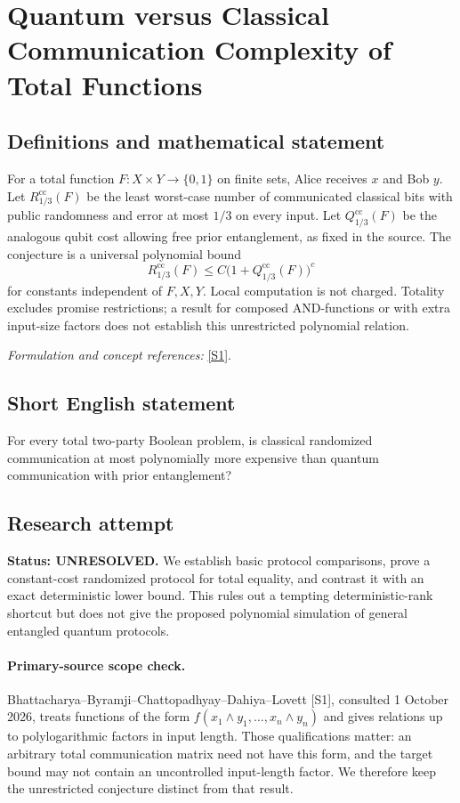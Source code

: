 \documentclass[11pt]{article}
\begin{document}
\section*{\texorpdfstring{Quantum versus Classical Communication Complexity of Total Functions}{Quantum versus Classical Communication Complexity of Total Functions}}\label{30006810}
\subsection{Definitions and mathematical statement}
For a total function $F:X\times Y\to\{0,1\}$ on finite sets, Alice receives $x$ and Bob $y$. Let $R^{\mathrm{cc}}_{1/3}(F)$ be the least worst-case number of communicated classical bits with public randomness and error at most $1/3$ on every input. Let $Q^{\mathrm{cc}}_{1/3}(F)$ be the analogous qubit cost allowing free prior entanglement, as fixed in the source. The conjecture is a universal polynomial bound
\[
 R^{\mathrm{cc}}_{1/3}(F)\le C\bigl(1+Q^{\mathrm{cc}}_{1/3}(F)\bigr)^c
\]
for constants independent of $F,X,Y$. Local computation is not charged. Totality excludes promise restrictions; a result for composed AND-functions or with extra input-size factors does not establish this unrestricted polynomial relation.
\par\smallskip\textit{Formulation and concept references:} \href{https://eccc.weizmann.ac.il/report/2026/013/download}{[S1]}.

\subsection{Short English statement}
For every total two-party Boolean problem, is classical randomized communication at most polynomially more expensive than quantum communication with prior entanglement?
\subsection{Research attempt}
\textbf{Status: UNRESOLVED.} We establish basic protocol comparisons, prove a constant-cost randomized protocol for total equality, and contrast it with an exact deterministic lower bound. This rules out a tempting deterministic-rank shortcut but does not give the proposed polynomial simulation of general entangled quantum protocols.

\paragraph{Primary-source scope check.}
Bhattacharya--Byramji--Chattopadhyay--Dahiya--Lovett [S1], consulted 1 October 2026, treats functions of the form $f(x_1\wedge y_1,\ldots,x_n\wedge y_n)$ and gives relations up to polylogarithmic factors in input length. Those qualifications matter: an arbitrary total communication matrix need not have this form, and the target bound may not contain an uncontrolled input-length factor. We therefore keep the unrestricted conjecture distinct from that result.
\end{document}
